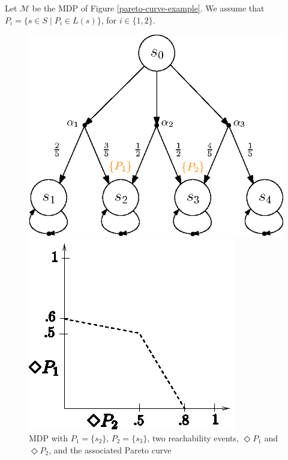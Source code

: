 \begin{example}
Let $\mathcal{M}$ be the MDP of Figure \ref{pareto-curve-example}.
We assume that $P_i = \{ s \in S \; | \; P_i \in L(s) \}$, for $i \in \{1, 2\}$.
  \begin{figure}[h]
    \begin{minipage}{0.5\linewidth}
      \centering
      \includegraphics[width=0.8\linewidth]{resources/pareto-curve-MDP}
    \end{minipage}
    \begin{minipage}{0.5\linewidth}
      \centering
      \includegraphics[width=0.7\linewidth]{resources/pareto-curve}
    \end{minipage}
    \captionsetup{justification=centering}
    \caption{MDP with $P_1 = \{s_2\}$, $P_2 = \{s_3\}$, two reachability events, $\Diamond P_1$ and $\Diamond P_2$, and the associated Pareto curve}

\end{figure}
\end{example}
